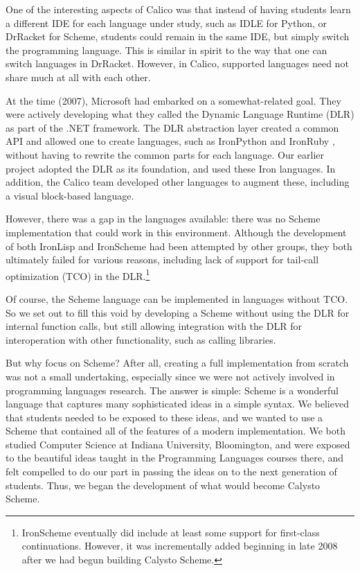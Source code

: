 \documentclass[acmsmall,screen,authorversion]{acmart}
\begin{document}
One of the interesting aspects of Calico was that instead of having
students learn a different IDE for each language under study, such as
IDLE for Python, or DrRacket for Scheme, students could remain in the
same IDE, but simply switch the programming language. This is similar
in spirit to the way that one can switch languages in
DrRacket. However, in Calico, supported languages need not share much
at all with each other.

At the time (2007), Microsoft had embarked on a somewhat-related goal. They
were actively developing what they called the Dynamic Language Runtime (DLR) as
part of the .NET framework. The DLR abstraction layer created a common API and
allowed one to create languages, such as IronPython and IronRuby
\cite{IronRuby}, without having to rewrite the common parts for each
language. Our earlier project adopted the DLR as its foundation, and used these
Iron languages. In addition, the Calico team developed other languages to
augment these, including a visual block-based language.

However, there was a gap in the languages available: there was no
Scheme implementation that could work in this environment. Although
the development of both IronLisp and IronScheme \cite{IronScheme} had
been attempted by other groups, they both ultimately failed for
various reasons, including lack of support for tail-call optimization
(TCO) in the DLR.\footnote[1]{IronScheme eventually did include at
least some support for first-class continuations. However, it was
incrementally added beginning in late 2008
\cite{IronScheme-Continuations} after we had begun building Calysto
Scheme.}

Of course, the Scheme language can be implemented in languages without
TCO. So we set out to fill this void by developing a Scheme without
using the DLR for internal function calls, but still allowing
integration with the DLR for interoperation with other functionality,
such as calling libraries.

But why focus on Scheme? After all, creating a full implementation from scratch
was not a small undertaking, especially since we were not actively involved in
programming languages research. The answer is simple: Scheme is a wonderful
language that captures many sophisticated ideas in a simple syntax. We believed
that students needed to be exposed to these ideas, and we wanted to use a
Scheme that contained all of the features of a modern implementation. We both
studied Computer Science at Indiana University, Bloomington, and were exposed
to the beautiful ideas taught in the Programming Languages courses there, and
felt compelled to do our part in passing the ideas on to the next generation of
students. Thus, we began the development of what would become Calysto Scheme.
\end{document}
